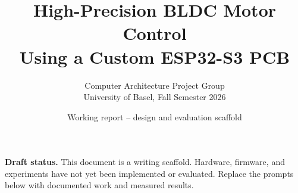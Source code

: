 \documentclass[11pt,a4paper]{article}
\title{High-Precision BLDC Motor Control\\Using a Custom ESP32-S3 PCB}
\author{Computer Architecture Project Group\\University of Basel, Fall Semester 2026}
\date{Working report -- design and evaluation scaffold}
\begin{document}
\maketitle
\noindent\textbf{Draft status.} This document is a writing scaffold. Hardware, firmware, and experiments have not yet been implemented or evaluated. Replace the prompts below with documented work and measured results.





\end{document}
